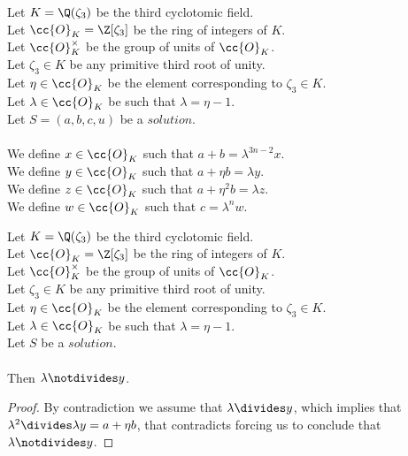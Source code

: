 \begin{definition}[$x,y,z,w$]
  \label{def:Solution_x_y_z_w}
  \leanok
  Let $K = \Q(\zeta_3)$ be the third cyclotomic field. \\
  Let $\cc{O}_K = \Z[\zeta_3]$ be the ring of integers of $K$. \\
  Let $\cc{O}^\times_K$ be the group of units of $\cc{O}_K$. \\
  Let $\zeta_3 \in K$ be any primitive third root of unity. \\
  Let $\eta \in \cc{O}_K$ be the element corresponding to $\zeta_3 \in K$. \\
  Let $\lambda \in \cc{O}_K$ be such that $\lambda = \eta -1$. \\
  Let $S=(a, b, c, u)$ be a $solution$.\\\\
  We define $x \in \cc{O}_K$ such that $a + b = \lambda^{3n-2}  x$.\\
  We define $y \in \cc{O}_K$ such that $a + \eta  b = \lambda  y$.\\
  We define $z \in \cc{O}_K$ such that $a + \eta^2  b = \lambda  z$.\\
  We define $w \in \cc{O}_K$ such that $c = \lambda^n  w$.
\end{definition}

\begin{lemma}
  \label{lmm:lambda_not_dvd_y}
  \leanok
  Let $K = \Q(\zeta_3)$ be the third cyclotomic field. \\
  Let $\cc{O}_K = \Z[\zeta_3]$ be the ring of integers of $K$. \\
  Let $\cc{O}^\times_K$ be the group of units of $\cc{O}_K$. \\
  Let $\zeta_3 \in K$ be any primitive third root of unity. \\
  Let $\eta \in \cc{O}_K$ be the element corresponding to $\zeta_3 \in K$. \\
  Let $\lambda \in \cc{O}_K$ be such that $\lambda = \eta -1$. \\
  Let $S$ be a $solution$.\\\\
  Then $\lambda \notdivides y$.
\end{lemma}
\begin{proof}
  \leanok
  By contradiction we assume that $\lambda \divides y$, which implies that
  $\lambda^2 \divides \lambda y = a + \eta b$, that contradicts
   forcing us to conclude that
  $\lambda \notdivides y$.
\end{proof}

